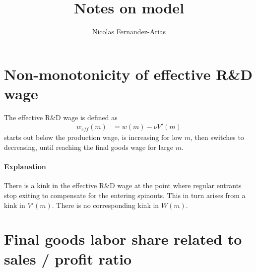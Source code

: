 \documentclass[12pt,english]{article}
\theoremstyle{remark}
\begin{document}
	
\title{Notes on model}
\author{Nicolas Fernandez-Arias}
\maketitle

\section{Non-monotonicity of effective R\&D wage}

The effective R\&D wage is defined as 
\begin{align*}
	w_{eff}(m) &= w(m) - \nu V'(m)
\end{align*}
starts out below the production wage, is increasing for low $m$, then switches to decreasing, until reaching the final goods wage for large $m$.

\paragraph{Explanation} There is a kink in the effective R\&D wage at the point where regular entrants stop exiting to compensate for the entering spinouts. This in turn arises from a kink in $V'(m)$. There is no corresponding kink in $W(m)$. 


\section{Final goods labor share related to sales / profit ratio}
\end{document}
